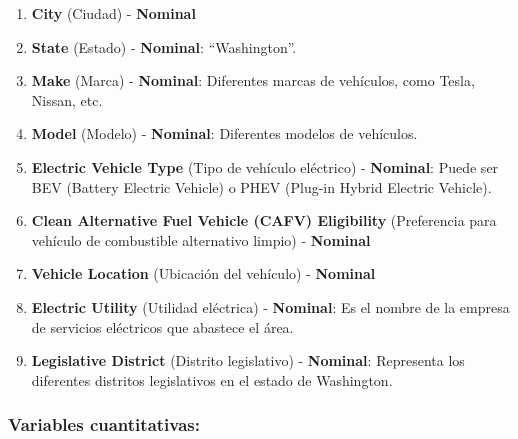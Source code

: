 \documentclass[
]{article}
\begin{document}
\begin{enumerate}
\def\labelenumi{\arabic{enumi}.}
\item
  \textbf{City} (Ciudad) - \textbf{Nominal}
\item
  \textbf{State} (Estado) - \textbf{Nominal}: ``Washington''.
\item
  \textbf{Make} (Marca) - \textbf{Nominal}: Diferentes marcas de
  vehículos, como Tesla, Nissan, etc.
\item
  \textbf{Model} (Modelo) - \textbf{Nominal}: Diferentes modelos de
  vehículos.
\item
  \textbf{Electric Vehicle Type} (Tipo de vehículo eléctrico) -
  \textbf{Nominal}: Puede ser BEV (Battery Electric Vehicle) o PHEV
  (Plug-in Hybrid Electric Vehicle).
\item
  \textbf{Clean Alternative Fuel Vehicle (CAFV) Eligibility}
  (Preferencia para vehículo de combustible alternativo limpio) -
  \textbf{Nominal}
\item
  \textbf{Vehicle Location} (Ubicación del vehículo) - \textbf{Nominal}
\item
  \textbf{Electric Utility} (Utilidad eléctrica) - \textbf{Nominal}: Es
  el nombre de la empresa de servicios eléctricos que abastece el área.
\item
  \textbf{Legislative District} (Distrito legislativo) -
  \textbf{Nominal}: Representa los diferentes distritos legislativos en
  el estado de Washington.
\end{enumerate}

\subsubsection{\texorpdfstring{\textbf{Variables
cuantitativas:}}{Variables cuantitativas:}}\label{variables-cuantitativas}
\end{document}
